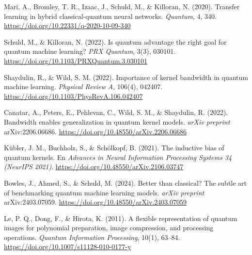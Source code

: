     Mari, A., Bromley, T. R., Izaac, J., Schuld, M., \& Killoran, N. (2020).
    Transfer learning in hybrid classical-quantum neural networks.
    \textit{Quantum}, 4, 340.
    \url{https://doi.org/10.22331/q-2020-10-09-340}

    Schuld, M., \& Killoran, N. (2022).
    Is quantum advantage the right goal for quantum machine learning?
    \textit{PRX Quantum}, 3(3), 030101.
    \url{https://doi.org/10.1103/PRXQuantum.3.030101}

    Shaydulin, R., \& Wild, S. M. (2022).
    Importance of kernel bandwidth in quantum machine learning.
    \textit{Physical Review A}, 106(4), 042407.
    \url{https://doi.org/10.1103/PhysRevA.106.042407}

    Canatar, A., Peters, E., Pehlevan, C., Wild, S. M., \& Shaydulin, R. (2022).
    Bandwidth enables generalization in quantum kernel models.
    \textit{arXiv preprint} arXiv:2206.06686.
    \url{https://doi.org/10.48550/arXiv.2206.06686}

    K\"ubler, J. M., Buchholz, S., \& Sch\"olkopf, B. (2021).
    The inductive bias of quantum kernels.
    En \textit{Advances in Neural Information Processing Systems 34 (NeurIPS 2021)}.
    \url{https://doi.org/10.48550/arXiv.2106.03747}

    Bowles, J., Ahmed, S., \& Schuld, M. (2024).
    Better than classical? The subtle art of benchmarking quantum machine learning models.
    \textit{arXiv preprint} arXiv:2403.07059.
    \url{https://doi.org/10.48550/arXiv.2403.07059}

    Le, P. Q., Dong, F., \& Hirota, K. (2011).
    A flexible representation of quantum images for polynomial preparation, image compression, and processing operations.
    \textit{Quantum Information Processing}, 10(1), 63--84.
    \url{https://doi.org/10.1007/s11128-010-0177-y}

